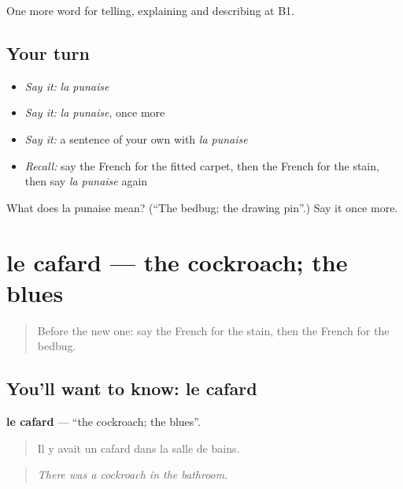 \begin{grammarlens}[title={What you've built}]
One more word for telling, explaining and describing at B1.
\end{grammarlens}

\subsection*{Your turn}
\begin{itemize}
\raggedright
  \item \emph{Say it:} \emph{la punaise}
  \item \emph{Say it:} \emph{la punaise}, once more
  \item \emph{Say it:} a sentence of your own with \emph{la punaise}
  \item \emph{Recall:} say the French for the fitted carpet, then the French for the stain, then say \emph{la punaise} again
\end{itemize}

\begin{tcolorbox}[breakable,colback=teal!4,colframe=teal!35!black,title={Before you move on}]
What does la punaise mean? (\textquotedblleft{}The bedbug; the drawing pin\textquotedblright{}.) Say it once more.
\end{tcolorbox}
\section[le cafard]{le cafard — the cockroach; the blues}

\label{lesson:FR-C430-cafard}



\begin{quote}
Before the new one: say the French for the stain, then the French for the bedbug.
\end{quote}

\subsection*{You'll want to know: le cafard}
\textbf{le cafard} — \textquotedblleft{}the cockroach; the blues\textquotedblright{}.

\begin{quote}
Il y avait un cafard dans la salle de bains.
\end{quote}

\begin{quote}
\emph{There was a cockroach in the bathroom.}
\end{quote}

